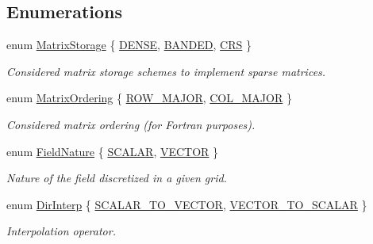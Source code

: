 \subsection*{Enumerations}
\begin{DoxyCompactItemize}
\item 
enum \hyperlink{group__c02-enums_ga25b67ec6a2afeee69f9bb196a9c66619}{Matrix\+Storage} \{ \hyperlink{group__c02-enums_ga25b67ec6a2afeee69f9bb196a9c66619a00a806d43a7d74e9ccca47a2134e9c87}{D\+E\+N\+S\+E}, 
\hyperlink{group__c02-enums_ga25b67ec6a2afeee69f9bb196a9c66619aef1d4271d5005282978a3a40a8a52c9b}{B\+A\+N\+D\+E\+D}, 
\hyperlink{group__c02-enums_ga25b67ec6a2afeee69f9bb196a9c66619a87619d374775e937bca967402b988b8b}{C\+R\+S}
 \}
\begin{DoxyCompactList}\small\item\em Considered matrix storage schemes to implement sparse matrices. \end{DoxyCompactList}\item 
enum \hyperlink{group__c02-enums_ga622801bd9f912d0f976c3e383f5f581c}{Matrix\+Ordering} \{ \hyperlink{group__c02-enums_ga622801bd9f912d0f976c3e383f5f581cabc55178ac16eb1ce89b5f3ab915a91f3}{R\+O\+W\+\_\+\+M\+A\+J\+O\+R}, 
\hyperlink{group__c02-enums_ga622801bd9f912d0f976c3e383f5f581ca7c11989c132253fb76b8f6b1314f7e13}{C\+O\+L\+\_\+\+M\+A\+J\+O\+R}
 \}
\begin{DoxyCompactList}\small\item\em Considered matrix ordering (for Fortran purposes). \end{DoxyCompactList}\item 
enum \hyperlink{group__c02-enums_ga4c54f2a329cfb4e56213b02a259d19e2}{Field\+Nature} \{ \hyperlink{group__c02-enums_ga4c54f2a329cfb4e56213b02a259d19e2af481d45bd70d41381c7d72e200889205}{S\+C\+A\+L\+A\+R}, 
\hyperlink{group__c02-enums_ga4c54f2a329cfb4e56213b02a259d19e2a3d8cb27a993651a74d67fb8c98ae91b2}{V\+E\+C\+T\+O\+R}
 \}
\begin{DoxyCompactList}\small\item\em Nature of the field discretized in a given grid. \end{DoxyCompactList}\item 
enum \hyperlink{group__c02-enums_ga674ec67bd1baa04e5dc06c2bcc351972}{Dir\+Interp} \{ \hyperlink{group__c02-enums_ga674ec67bd1baa04e5dc06c2bcc351972abc9e2b8cd5a497c9f3252a792e356139}{S\+C\+A\+L\+A\+R\+\_\+\+T\+O\+\_\+\+V\+E\+C\+T\+O\+R}, 
\hyperlink{group__c02-enums_ga674ec67bd1baa04e5dc06c2bcc351972a122cf2e24aef105e9214698206af6904}{V\+E\+C\+T\+O\+R\+\_\+\+T\+O\+\_\+\+S\+C\+A\+L\+A\+R}
 \}
\begin{DoxyCompactList}\small\item\em Interpolation operator. \end{DoxyCompactList}\end{DoxyCompactItemize}
